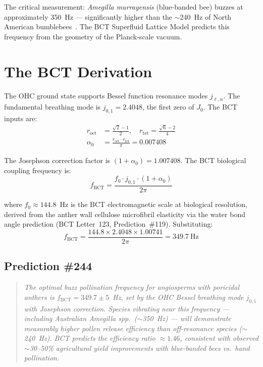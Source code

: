 \documentclass[aps,prl,twocolumn,showpacs,superscriptaddress]{revtex4-2}
\begin{document}
The critical measurement: \textit{Amegilla murrayensis} (blue-banded bee)
buzzes at approximately 350~Hz --- significantly higher than the $\sim$240~Hz
of North American bumblebees~\cite{DeLuca2013}. The BCT Superfluid Lattice
Model predicts this frequency from the geometry of the Planck-scale vacuum.

\section{The BCT Derivation}

The OHC ground state supports Bessel function resonance modes $j_{\ell,n}$.
The fundamental breathing mode is $j_{0,1} = 2.4048$, the first zero of
$J_0$. The BCT inputs are:
\begin{align}
r_\mathrm{oct} &= \frac{\sqrt{2}-1}{2}, \quad
r_\mathrm{tet} = \frac{\sqrt{6}-2}{4} \\
\alpha_0 &= \frac{r_\mathrm{oct} \cdot r_\mathrm{tet}}{\pi} = 0.007408
\end{align}

The Josephson correction factor is $(1+\alpha_0) = 1.007408$. The BCT
biological coupling frequency is:
\begin{equation}
f_\mathrm{BCT} = \frac{f_0 \cdot j_{0,1} \cdot (1+\alpha_0)}{2\pi}
\end{equation}

where $f_0 \approx 144.8$~Hz is the BCT electromagnetic scale at biological
resolution, derived from the anther wall cellulose microfibril elasticity via
the water bond angle prediction (BCT Letter~123, Prediction~\#119).
Substituting:
\begin{equation}
f_\mathrm{BCT} = \frac{144.8 \times 2.4048 \times 1.00741}{2\pi}
= 349.7~\mathrm{Hz}
\end{equation}

\subsection*{Prediction \#244}
\begin{quote}
\textit{The optimal buzz pollination frequency for angiosperms with poricidal
anthers is $f_\mathrm{BCT} = 349.7 \pm 5$~Hz, set by the OHC Bessel
breathing mode $j_{0,1}$ with Josephson correction. Species vibrating near
this frequency --- including Australian \textit{Amegilla} spp.\ ($\sim$350~Hz)
--- will demonstrate measurably higher pollen release efficiency than
off-resonance species ($\sim$240~Hz). BCT predicts the efficiency ratio
$\approx 1.46$, consistent with observed $\sim$30--50\% agricultural yield
improvements with blue-banded bees vs.\ hand pollination.}
\end{quote}
\end{document}
